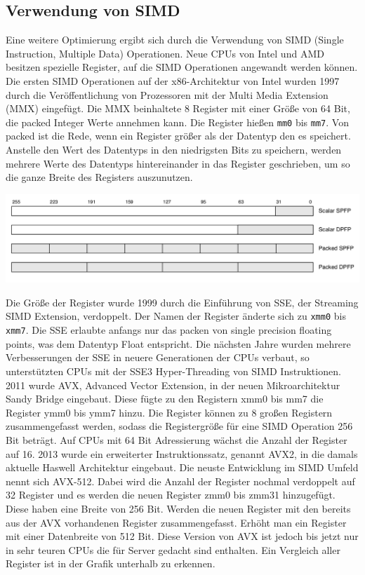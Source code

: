 \documentclass[../main.tex]{subfiles}
\begin{document}
\subsection{Verwendung von SIMD}

Eine weitere Optimierung ergibt sich durch die Verwendung von SIMD (Single Instruction, Multiple Data) Operationen.  Neue CPUs von Intel und AMD besitzen spezielle Register, auf die SIMD Operationen angewandt werden können. 
Die ersten SIMD Operationen auf der x86-Architektur von Intel wurden 1997 durch die Veröffentlichung von Prozessoren mit der Multi Media Extension (MMX) eingefügt. Die MMX beinhaltete 8 Register mit einer Größe von 64 Bit, die packed Integer Werte annehmen kann. Die Register hießen \texttt{mm0} bis \texttt{mm7}.
Von packed ist die Rede, wenn ein Register größer als der Datentyp den es speichert. Anstelle den Wert des Datentyps in den niedrigsten Bits zu speichern, werden mehrere Werte des Datentyps hintereinander in das Register geschrieben, um so die ganze Breite des Registers auszunutzen.

\includegraphics[width=\textwidth]{../images/Benz/avx_packed_scalar.png}

Die Größe der Register wurde 1999 durch die Einführung von SSE, der Streaming SIMD Extension, verdoppelt. Der Namen der Register änderte sich zu \texttt{xmm0} bis \texttt{xmm7}. Die SSE erlaubte anfangs nur das packen von single precision floating points, was dem Datentyp Float entspricht. Die nächsten Jahre wurden mehrere Verbesserungen der SSE in neuere Generationen der CPUs verbaut, so unterstützten CPUs mit der SSE3 Hyper-Threading von SIMD Instruktionen.
2011 wurde AVX, Advanced Vector Extension, in der neuen Mikroarchitektur Sandy Bridge eingebaut. Diese fügte zu den Registern xmm0 bis mm7 die Register ymm0 bis ymm7 hinzu. Die Register können zu 8 großen Registern zusammengefasst werden, sodass die Registergröße für eine SIMD Operation 256 Bit beträgt. Auf CPUs mit 64 Bit Adressierung wächst die Anzahl der Register auf 16. 2013 wurde ein erweiterter Instruktionssatz, genannt AVX2, in die damals aktuelle Haswell Architektur eingebaut.
Die neuste Entwicklung im SIMD Umfeld nennt sich AVX-512. Dabei wird die Anzahl der Register nochmal verdoppelt auf 32 Register und es werden die neuen Register zmm0 bis zmm31 hinzugefügt. Diese haben eine Breite von 256 Bit. Werden die neuen Register mit den bereits aus der AVX vorhandenen Register zusammengefasst. Erhöht man ein Register mit einer Datenbreite von 512 Bit. Diese Version von AVX ist jedoch bis jetzt nur in sehr teuren CPUs die für Server gedacht sind enthalten.
Ein Vergleich aller Register ist in der Grafik unterhalb zu erkennen.
\end{document}
